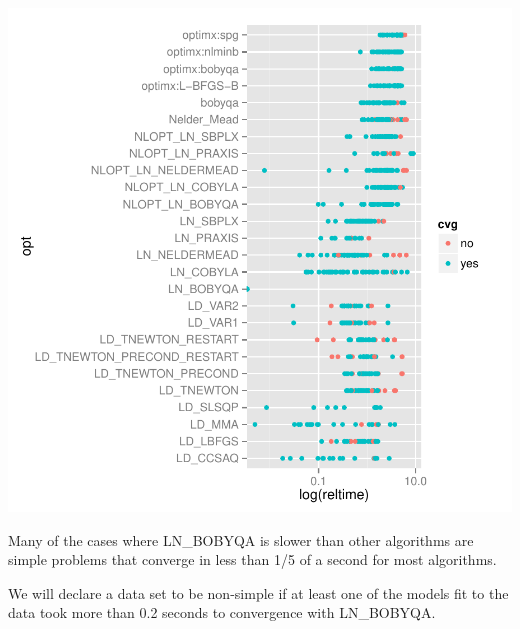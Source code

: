 \documentclass[article]{jss}
\begin{document}
\begin{Schunk}
\end{Schunk}
\includegraphics{Paper-013}


Many of the cases where LN_BOBYQA is slower than other algorithms are simple problems that converge in less than 1/5 of a second for most algorithms.

We will declare a data set to be non-simple if at least one of the models fit to the data took more than 0.2 seconds to convergence with LN_BOBYQA.
\end{document}
